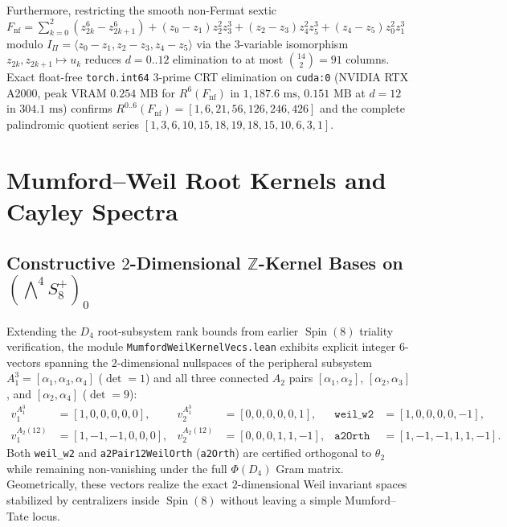 \documentclass[11pt,a4paper]{article}
\begin{document}
Furthermore, restricting the smooth non-Fermat sextic $F_{\mathrm{nf}} = \sum_{k=0}^2 (z_{2k}^6 - z_{2k+1}^6) + (z_0{-}z_1) z_2^2 z_3^3 + (z_2{-}z_3) z_4^2 z_5^3 + (z_4{-}z_5) z_0^2 z_1^3$ modulo $I_\Pi = \langle z_0{-}z_1, z_2{-}z_3, z_4{-}z_5 \rangle$ via the $3$-variable isomorphism $z_{2k}, z_{2k+1} \mapsto u_k$ reduces $d = 0..12$ elimination to at most $\binom{14}{2} = 91$ columns. Exact float-free \texttt{torch.int64} $3$-prime CRT elimination on \texttt{cuda:0} (NVIDIA RTX A2000, peak VRAM $0.254\text{ MB}$ for $R^6(F_{\mathrm{nf}})$ in $1{,}187.6\text{ ms}$, $0.151\text{ MB}$ at $d = 12$ in $304.1\text{ ms}$) confirms $R^{0..6}(F_{\mathrm{nf}}) = [1, 6, 21, 56, 126, 246, 426]$ and the complete palindromic quotient series $[1, 3, 6, 10, 15, 18, 19, 18, 15, 10, 6, 3, 1]$.

\section{Mumford--Weil Root Kernels and Cayley Spectra}

\subsection{Constructive $2$-Dimensional $\mathbb{Z}$-Kernel Bases on $(\bigwedge^4 S^+_8)_0$}

Extending the $D_4$ root-subsystem rank bounds from earlier $\operatorname{Spin}(8)$ triality verification, the module \texttt{MumfordWeilKernelVecs.lean} exhibits explicit integer $6$-vectors spanning the $2$-dimensional nullspaces of the peripheral subsystem $A_1^3 = [\alpha_1, \alpha_3, \alpha_4]$ ($\det = 1$) and all three connected $A_2$ pairs $[\alpha_1,\alpha_2]$, $[\alpha_2,\alpha_3]$, and $[\alpha_2,\alpha_4]$ ($\det = 9$):
\begin{equation}
  \begin{aligned}
    v_1^{A_1^3} &= [1,0,0,0,0,0], & v_2^{A_1^3} &= [0,0,0,0,0,1], & \texttt{weil\_w2} &= [1,0,0,0,0,-1], \\
    v_1^{A_2(12)} &= [1,-1,-1,0,0,0], & v_2^{A_2(12)} &= [0,0,0,1,1,-1], & \texttt{a2Orth} &= [1,-1,-1,1,1,-1].
  \end{aligned}
\end{equation}
Both \texttt{weil\_w2} and \texttt{a2Pair12WeilOrth} (\texttt{a2Orth}) are certified orthogonal to $\theta_2$ while remaining non-vanishing under the full $\Phi(D_4)$ Gram matrix. Geometrically, these vectors realize the exact $2$-dimensional Weil invariant spaces stabilized by centralizers inside $\operatorname{Spin}(8)$ without leaving a simple Mumford--Tate locus.
\end{document}
